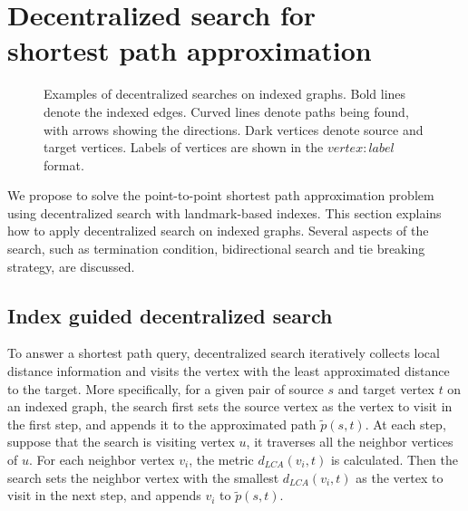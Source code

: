 \section{Decentralized search for \\ shortest path approximation}
\label{searching}

\begin{figure*}[ht]
    \centering
    \caption{Examples of decentralized searches on indexed graphs. Bold lines denote the indexed edges. Curved lines denote paths being found, with arrows showing the directions. Dark vertices denote source and target vertices. Labels of vertices are shown in the $vertex:label$ format.}
\end{figure*}

We propose to solve the point-to-point shortest path approximation problem using decentralized search with landmark-based indexes. This section explains how to apply decentralized search on indexed graphs. Several aspects of the search, such as termination condition, bidirectional search and tie breaking strategy, are discussed.

\subsection{Index guided decentralized search}

To answer a shortest path query, decentralized search iteratively collects local distance information and visits the vertex with the least approximated distance to the target. More specifically, for a given pair of source $s$ and target vertex $t$ on an indexed graph, the search first sets the source vertex as the vertex to visit in the first step, and appends it to the approximated path $\tilde{p}(s,t)$. At each step, suppose that the search is visiting vertex $u$, it traverses all the neighbor vertices of $u$. For each neighbor vertex $v_i$, the metric $d_{LCA}(v_i,t)$ is calculated. Then the search sets the neighbor vertex with the smallest $d_{LCA}(v_i,t)$ as the vertex to visit in the next step, and appends $v_i$ to $\tilde{p}(s,t)$.

